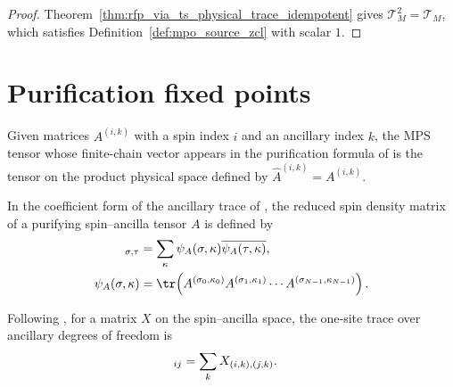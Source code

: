 \begin{proof}
    \leanok
    Theorem~\ref{thm:rfp_via_ts_physical_trace_idempotent} gives
    $\mathcal T_M^2=\mathcal T_M$, which satisfies Definition~\ref{def:mpo_source_zcl}
    with scalar $1$.
\end{proof}

\section{Purification fixed points}

\begin{definition}
    \label{def:mpdo_purification_tensor}
    \leanok
    Given matrices $A^{(i,k)}$ with a spin index $i$ and an ancillary index
    $k$, the MPS tensor whose finite-chain vector appears in the purification
    formula of \cite[lines~744--751]{Cirac2016MPDO_arXiv} is the tensor on the
    product physical space defined by $\widehat A^{(i,k)}=A^{(i,k)}$.
\end{definition}

\begin{definition}
    \label{def:mpdo_purification_density}
    \leanok
    In the coefficient form of the ancillary trace of
    \cite[eq.~\textup{(4.7)}, line~751]{Cirac2016MPDO_arXiv}, the reduced spin
    density matrix of a purifying spin--ancilla tensor $A$ is defined by
    \begin{align}
        [\rho^{(N)}_p(A)]_{\sigma,\tau}
         & =
        \sum_{\kappa}
        \psi_A(\sigma,\kappa)
        \overline{\psi_A(\tau,\kappa)},
        \notag \\
        \psi_A(\sigma,\kappa)
         & =
        \tr\!\left(A^{(\sigma_0,\kappa_0)}
        A^{(\sigma_1,\kappa_1)}
        \cdots
        A^{(\sigma_{N-1},\kappa_{N-1})}\right).
        \notag
    \end{align}
\end{definition}

\begin{definition}
    \label{def:mpdo_ancillary_trace_map}
    \leanok

    Following \cite[lines~751 and~761--764]{Cirac2016MPDO_arXiv}, for a matrix
    $X$ on the spin--ancilla space, the one-site trace over ancillary degrees
    of freedom is
    \begin{align}
        [\tr_a(X)]_{ij}
         & =
        \sum_k X_{(i,k),(j,k)}.
        \notag
    \end{align}
\end{definition}

